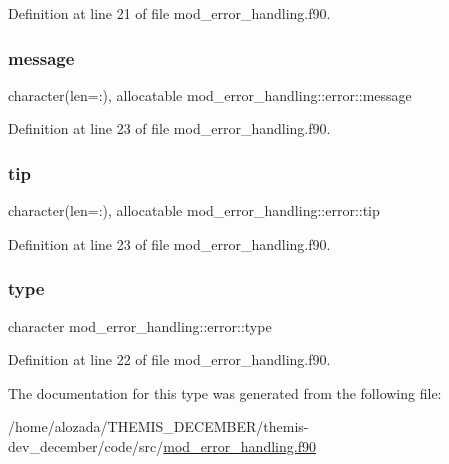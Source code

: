 Definition at line 21 of file mod\+\_\+error\+\_\+handling.\+f90.

\mbox{\label{structmod__error__handling_1_1error_ae7b71e5d1a4f545a4bbfe080e27088cb}} 
\subsubsection{\texorpdfstring{message}{message}}
{\footnotesize\ttfamily character(len=\+:), allocatable mod\+\_\+error\+\_\+handling\+::error\+::message}



Definition at line 23 of file mod\+\_\+error\+\_\+handling.\+f90.

\mbox{\label{structmod__error__handling_1_1error_a65c72d5ba9239b5c0d08e9430beb88a9}} 
\subsubsection{\texorpdfstring{tip}{tip}}
{\footnotesize\ttfamily character(len=\+:), allocatable mod\+\_\+error\+\_\+handling\+::error\+::tip}



Definition at line 23 of file mod\+\_\+error\+\_\+handling.\+f90.

\mbox{\label{structmod__error__handling_1_1error_abe8bce46119248009e003845d959f21a}} 
\subsubsection{\texorpdfstring{type}{type}}
{\footnotesize\ttfamily character mod\+\_\+error\+\_\+handling\+::error\+::type}



Definition at line 22 of file mod\+\_\+error\+\_\+handling.\+f90.



The documentation for this type was generated from the following file\+:\begin{DoxyCompactItemize}
\item 
/home/alozada/\+T\+H\+E\+M\+I\+S\+\_\+\+D\+E\+C\+E\+M\+B\+E\+R/themis-\/dev\+\_\+december/code/src/\hyperlink{mod__error__handling_8f90}{mod\+\_\+error\+\_\+handling.\+f90}\end{DoxyCompactItemize}
